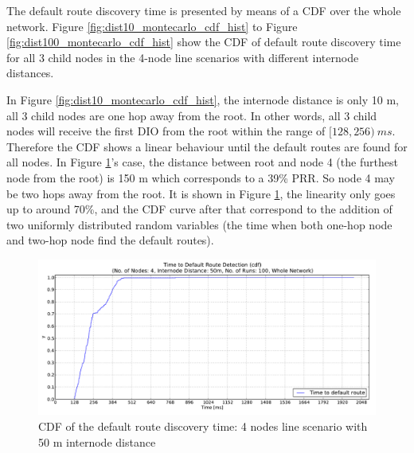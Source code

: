 The default route discovery time is presented by means of a CDF over the whole network. Figure \ref{fig:dist10_montecarlo_cdf_hist} to Figure \ref{fig:dist100_montecarlo_cdf_hist} show the CDF of default route discovery time for all 3 child nodes in the 4-node line scenarios with different internode distances.
\newline

In Figure \ref{fig:dist10_montecarlo_cdf_hist}, the internode distance is only 10 m, all 3 child nodes are one hop away from the root. In other words, all 3 child nodes will receive the first DIO from the root within the range of $[128, 256)\:ms$. Therefore the CDF shows a linear behaviour until the default routes are found for all nodes. In Figure \ref{fig:dist50_montecarlo_cdf_hist}\@'s case, the distance between root and node 4 (the furthest node from the root) is 150 m which corresponds to a 39\% PRR. So node 4 may be two hops away from the root. It is shown in Figure \ref{fig:dist50_montecarlo_cdf_hist}, the linearity only goes up to around 70\%, and the CDF curve after that correspond to the addition of two uniformly distributed random variables (the time when both one-hop node and two-hop node find the default routes).  
\newline
\begin{figure}[htbp]
  \begin{center}
    \leavevmode
      \includegraphics[scale=0.38]
      {Pics/results/4/MRHOF/line/dist50_montecarlo_cdf_hist.pdf}
   \caption{CDF of the default route discovery time: 4 nodes line scenario with 50 m internode distance}
    \label{fig:dist50_montecarlo_cdf_hist}
  \end{center}
\end{figure}
  
